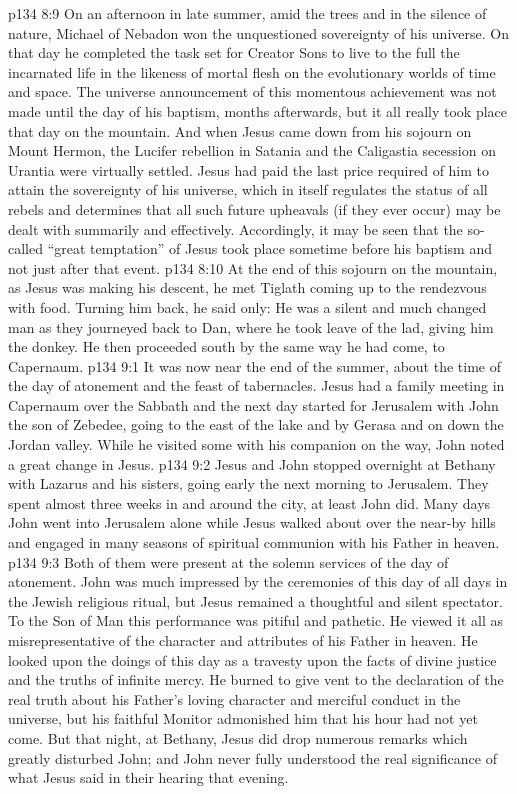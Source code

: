 \vs p134 8:9 \pc On an afternoon in late summer, amid the trees and in the silence of nature, Michael of Nebadon won the unquestioned sovereignty of his universe. On that day he completed the task set for Creator Sons to live to the full the incarnated life in the likeness of mortal flesh on the evolutionary worlds of time and space. The universe announcement of this momentous achievement was not made until the day of his baptism, months afterwards, but it all really took place that day on the mountain. And when Jesus came down from his sojourn on Mount Hermon, the Lucifer rebellion in Satania and the Caligastia secession on Urantia were virtually settled. Jesus had paid the last price required of him to attain the sovereignty of his universe, which in itself regulates the status of all rebels and determines that all such future upheavals (if they ever occur) may be dealt with summarily and effectively. Accordingly, it may be seen that the so\hyp{}called “great temptation” of Jesus took place sometime before his baptism and not just after that event.
\vs p134 8:10 At the end of this sojourn on the mountain, as Jesus was making his descent, he met Tiglath coming up to the rendezvous with food. Turning him back, he said only:  He was a silent and much changed man as they journeyed back to Dan, where he took leave of the lad, giving him the donkey. He then proceeded south by the same way he had come, to Capernaum.
\vs p134 9:1 It was now near the end of the summer, about the time of the day of atonement and the feast of tabernacles. Jesus had a family meeting in Capernaum over the Sabbath and the next day started for Jerusalem with John the son of Zebedee, going to the east of the lake and by Gerasa and on down the Jordan valley. While he visited some with his companion on the way, John noted a great change in Jesus.
\vs p134 9:2 Jesus and John stopped overnight at Bethany with Lazarus and his sisters, going early the next morning to Jerusalem. They spent almost three weeks in and around the city, at least John did. Many days John went into Jerusalem alone while Jesus walked about over the near\hyp{}by hills and engaged in many seasons of spiritual communion with his Father in heaven.
\vs p134 9:3 Both of them were present at the solemn services of the day of atonement. John was much impressed by the ceremonies of this day of all days in the Jewish religious ritual, but Jesus remained a thoughtful and silent spectator. To the Son of Man this performance was pitiful and pathetic. He viewed it all as misrepresentative of the character and attributes of his Father in heaven. He looked upon the doings of this day as a travesty upon the facts of divine justice and the truths of infinite mercy. He burned to give vent to the declaration of the real truth about his Father’s loving character and merciful conduct in the universe, but his faithful Monitor admonished him that his hour had not yet come. But that night, at Bethany, Jesus did drop numerous remarks which greatly disturbed John; and John never fully understood the real significance of what Jesus said in their hearing that evening.
